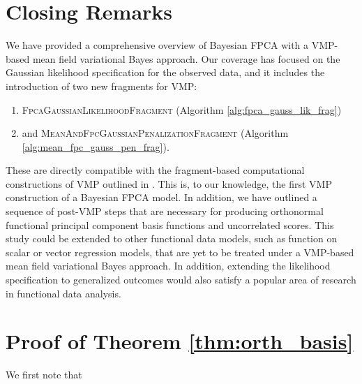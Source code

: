 \documentclass[12pt]{article}
\theoremstyle{plain}
\theoremstyle{definition}
\theoremstyle{remark}
\begin{document}

\section{Closing Remarks}
\label{sec:closing_remarks}

We have provided a comprehensive overview of Bayesian FPCA with a VMP-based mean field variational Bayes
approach. Our coverage has focused on the Gaussian likelihood specification for the observed data, and it
includes the introduction of two new fragments for VMP:

\begin{enumerate}
	\item \textsc{FpcaGaussianLikelihoodFragment} (Algorithm \ref{alg:fpca_gauss_lik_frag})
	\item and \textsc{MeanAndFpcGaussianPenalizationFragment} (Algorithm \ref{alg:mean_fpc_gauss_pen_frag}).
\end{enumerate}

\noindent These are directly compatible with the fragment-based computational constructions of VMP outlined in
. This is, to our knowledge, the first VMP construction of a Bayesian FPCA model. In addition,
we have outlined a sequence of post-VMP steps that are necessary for producing orthonormal functional
principal component basis functions and uncorrelated scores. This study could be extended to other
functional data models, such as function on scalar or vector regression models, that are yet to be treated
under a VMP-based mean field variational Bayes approach. In addition, extending the likelihood specification to
generalized outcomes would also satisfy a popular area of research in functional data analysis.





\appendix


\section{Proof of Theorem \ref{thm:orth_basis}}
\label{app:proof_thm_orth_basis}

We first note that
\end{document}
